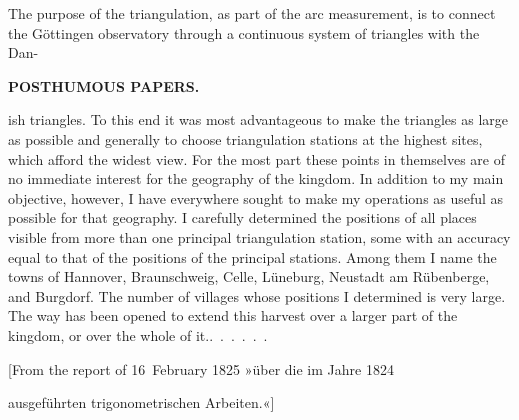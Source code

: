 The purpose of the triangulation, as part of the arc measurement, is to connect
the Göttingen observatory through a continuous system of triangles with the \mbox{Dan-}
\par\smallskip\noindent\hfill\makebox[0.18\linewidth][l]{52\textsuperscript{*}}\par
\clearpage
\noindent{}\hfill{\small\textbf{POSTHUMOUS PAPERS.}}\hfill\null\par\medskip
\noindent ish triangles. To this end it was most advantageous to make the triangles
as large as possible and generally to choose triangulation stations at the
highest sites, which afford the widest view. For the most part these points in
themselves are of no immediate interest for the geography of the kingdom. In
addition to my main objective, however, I have everywhere sought to make my
operations as useful as possible for that geography. I carefully determined the
positions of all places visible from more than one principal triangulation
station, some with an accuracy equal to that of the positions of the principal
stations. Among them I name the towns of Hannover, Braunschweig, Celle, Lüneburg,
Neustadt am Rübenberge, and Burgdorf. The number of villages whose positions I
determined is very large. The way has been opened to extend this harvest over a
larger part of the kingdom, or over the whole of it.\quad\mbox{.\ .\ .\ .\ .\ .}

\bigskip
\begin{center}
[From the report of 16~February 1825 »über die im Jahre 1824\par
ausgeführten trigonometrischen Arbeiten.«]
\end{center}

